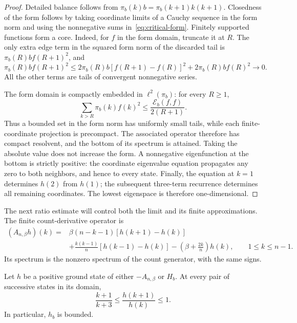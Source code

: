 \begin{proof}
Detailed balance follows from
$\pi_b(k)b=\pi_b(k+1)k(k+1)$.  Closedness of the form follows by taking
coordinate limits of a Cauchy sequence in the form norm and using the
nonnegative sums in~\eqref{eq:critical-form}.  Finitely supported
functions form a core.  Indeed, for $f$ in the form domain, truncate it
at $R$.  The only extra edge term in the squared form norm of the
discarded tail is $\pi_b(R)b f(R+1)^2$, and
\[
 \pi_b(R)b f(R+1)^2
 \leq 2\pi_b(R)b[f(R+1)-f(R)]^2
       +2\pi_b(R)b f(R)^2\longrightarrow0.
\]
All the other terms are tails of convergent nonnegative series.

The form domain is compactly embedded in $\ell^2(\pi_b)$: for every
$R\geq1$,
\begin{equation}\label{eq:critical-compact-tail}
 \sum_{k>R}\pi_b(k)f(k)^2
 \leq\frac{\mathcal E_b(f,f)}{2(R+1)}.
\end{equation}
Thus a bounded set in the form norm has uniformly small tails, while
each finite-coordinate projection is precompact.  The associated
operator therefore has compact resolvent, and the bottom of its
spectrum is attained.  Taking the absolute value does not increase the
form.  A nonnegative eigenfunction at the bottom is strictly positive:
the coordinate eigenvalue equation propagates any zero to both
neighbors, and hence to every state.  Finally, the equation at $k=1$
determines $h(2)$ from $h(1)$; the subsequent three-term recurrence
determines all remaining coordinates.  The lowest eigenspace is
therefore one-dimensional.
\end{proof}

The next ratio estimate will control both the limit and its finite
approximations.  The finite count-derivative operator is
\begin{equation}\label{eq:critical-finite-derivative}
 \begin{split}
 (A_{n,\beta}h)(k)
 ={}&\beta(n-k-1)[h(k+1)-h(k)]\\
 &+\frac{k(k-1)}n[h(k-1)-h(k)]
   -\left(\beta+\frac{2k}n\right)h(k),
 \qquad 1\leq k\leq n-1.
 \end{split}
\end{equation}
Its spectrum is the nonzero spectrum of the count generator, with the
same signs.

\begin{lemma}
\label{lem:critical-ground-ratios}
Let $h$ be a positive ground state of either $-A_{n,\beta}$ or $H_b$.
At every pair of successive states in its domain,
\begin{equation}\label{eq:critical-ratio-bounds}
 \frac{k+1}{k+3}\leq\frac{h(k+1)}{h(k)}\leq1.
\end{equation}
In particular, $h_b$ is bounded.
\end{lemma}

